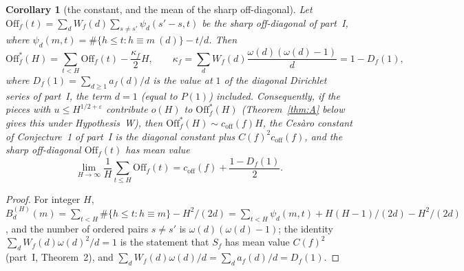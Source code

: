 \documentclass[11pt,a4paper]{article}
\newtheorem{corollary}[theorem]{Corollary}
\theoremstyle{remark}\newtheorem{remark}[theorem]{Remark}
\newcommand{\Off}{\mathrm{Off}}\newcommand{\e}{\mathrm{e}}
\begin{document}
\begin{corollary}[the constant, and the mean of the sharp off-diagonal]\label{cor:coff}
Let $\Off_f(t)=\sum_dW_f(d)\sum_{s\ne s'}\psi_d(s'-s,t)$ be the sharp off-diagonal of part~I, where
$\psi_d(m,t)=\#\{h\le t:h\equiv m\ (d)\}-t/d$. Then
\begin{equation}\label{eq:sharpcesaro}
\Off^\ast_f(H)=\sum_{t<H}\Off_f(t)-\frac{\kappa_f}2H,\qquad\kappa_f=\sum_dW_f(d)\frac{\omega(d)(\omega(d)-1)}d=1-D_f(1),
\end{equation}
where $D_f(1)=\sum_{d\ge1}a_f(d)/d$ is the value at $1$ of the diagonal Dirichlet series of part~I, the term $d=1$
(equal to $P(1)$) included. Consequently, if the
pieces with $u\le H^{1/2+\varepsilon}$ contribute $o(H)$ to $\Off^\ast_f(H)$ (Theorem~\ref{thm:A} below gives this under
Hypothesis~W), then $\Off^\ast_f(H)\sim c_{\mathrm{off}}(f)H$, the Ces\`aro constant of Conjecture~1 of part~I is the
diagonal constant plus $C(f)^2c_{\mathrm{off}}(f)$, and the sharp off-diagonal $\Off_f(t)$ has mean value
\[
\lim_{H\to\infty}\frac1H\sum_{t\le H}\Off_f(t)=c_{\mathrm{off}}(f)+\frac{1-D_f(1)}2 .
\]
\end{corollary}
\begin{proof}
For integer $H$, $B^{(H)}_d(m)=\sum_{t<H}\#\{h\le t:h\equiv m\}-H^2/(2d)=\sum_{t<H}\psi_d(m,t)+H(H-1)/(2d)-H^2/(2d)$, and the
number of ordered pairs $s\ne s'$ is $\omega(d)(\omega(d)-1)$; the identity $\sum_dW_f(d)\omega(d)^2/d=1$ is the statement
that $S_f$ has mean value $C(f)^2$ (part~I, Theorem~2), and $\sum_dW_f(d)\omega(d)/d=\sum_da_f(d)/d=D_f(1)$.
\end{proof}
\end{document}
